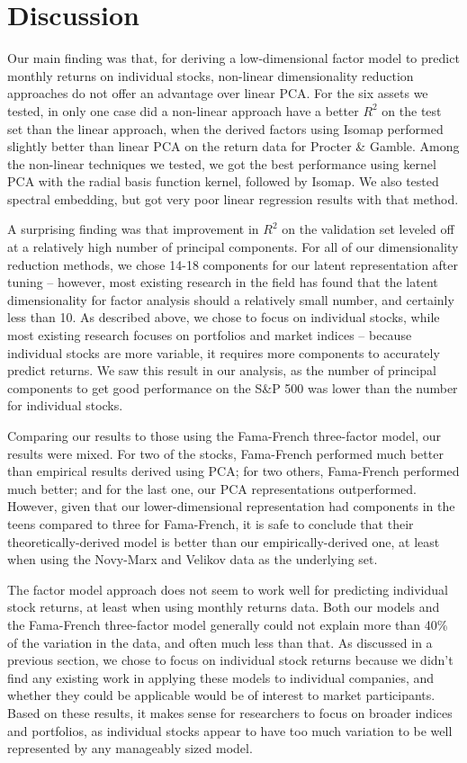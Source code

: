\documentclass[a4paper]{article}
\begin{document}
    \section{Discussion}
    \par Our main finding was that, for deriving a low-dimensional factor model to predict monthly returns on individual stocks, non-linear dimensionality reduction approaches do not offer an advantage over linear PCA. For the six assets we tested, in only one case did a non-linear approach have a better $R^2$ on the test set than the linear approach, when the derived factors using Isomap performed slightly better than linear PCA on the return data for Procter \& Gamble. Among the non-linear techniques we tested, we got the best performance using kernel PCA with the radial basis function kernel, followed by Isomap. We also tested spectral embedding, but got very poor linear regression results with that method.
    \par A surprising finding was that improvement in $R^2$ on the validation set leveled off at a relatively high number of principal components. For all of our dimensionality reduction methods, we chose 14-18 components for our latent representation after tuning – however, most existing research in the field has found that the latent dimensionality for factor analysis should a relatively small number, and certainly less than 10. As described above, we chose to focus on individual stocks, while most existing research focuses on portfolios and market indices – because individual stocks are more variable, it requires more components to accurately predict returns. We saw this result in our analysis, as the number of principal components to get good performance on the S\&P 500 was lower than the number for individual stocks.
    \par Comparing our results to those using the Fama-French three-factor model, our results were mixed. For two of the stocks, Fama-French performed much better than empirical results derived using PCA; for two others, Fama-French performed much better; and for the last one, our PCA representations outperformed. However, given that our lower-dimensional representation had components in the teens compared to three for Fama-French, it is safe to conclude that their theoretically-derived model is better than our empirically-derived one, at least when using the Novy-Marx and Velikov data as the underlying set.
    \par The factor model approach does not seem to work well for predicting individual stock returns, at least when using monthly returns data. Both our models and the Fama-French three-factor model generally could not explain more than 40\% of the variation in the data, and often much less than that. As discussed in a previous section, we chose to focus on individual stock returns because we didn't find any existing work in applying these models to individual companies, and whether they could be applicable would be of interest to market participants. Based on these results, it makes sense for researchers to focus on broader indices and portfolios, as individual stocks appear to have too much variation to be well represented by any manageably sized model.
\end{document}
